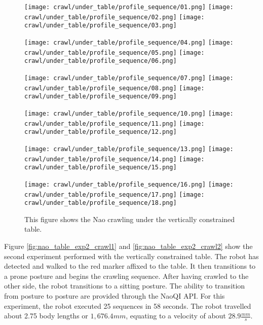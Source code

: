 \begin{figure}
  \centerline{
    \texttt{[image: crawl/under\_table/profile\_sequence/01.png]}
    \texttt{[image: crawl/under\_table/profile\_sequence/02.png]}
    \texttt{[image: crawl/under\_table/profile\_sequence/03.png]}
  }
  \vspace*{0.05in}
  \centerline{
    \texttt{[image: crawl/under\_table/profile\_sequence/04.png]}
    \texttt{[image: crawl/under\_table/profile\_sequence/05.png]}
    \texttt{[image: crawl/under\_table/profile\_sequence/06.png]}
  }
    \vspace*{0.05in}
  \centerline{
    \texttt{[image: crawl/under\_table/profile\_sequence/07.png]}
    \texttt{[image: crawl/under\_table/profile\_sequence/08.png]}
    \texttt{[image: crawl/under\_table/profile\_sequence/09.png]}
  }
    \vspace*{0.05in}
  \centerline{
    \texttt{[image: crawl/under\_table/profile\_sequence/10.png]}
    \texttt{[image: crawl/under\_table/profile\_sequence/11.png]}
    \texttt{[image: crawl/under\_table/profile\_sequence/12.png]}
  }
    \vspace*{0.05in}
  \centerline{
    \texttt{[image: crawl/under\_table/profile\_sequence/13.png]}
    \texttt{[image: crawl/under\_table/profile\_sequence/14.png]}
    \texttt{[image: crawl/under\_table/profile\_sequence/15.png]}
  }
    \vspace*{0.05in}
  \centerline{
    \texttt{[image: crawl/under\_table/profile\_sequence/16.png]}
    \texttt{[image: crawl/under\_table/profile\_sequence/17.png]}
    \texttt{[image: crawl/under\_table/profile\_sequence/18.png]}
  }
  \caption{This figure shows the Nao crawling under the vertically constrained table.}
  \label{fig:nao_table_exp1_crawl1}
\end{figure}

Figure \ref{fig:nao_table_exp2_crawl1} and \ref{fig:nao_table_exp2_crawl2} show the second
experiment performed with the vertically constrained table. The robot has detected and walked to
the red marker affixed to the table. It then transitions to a prone posture and begins the crawling
sequence. After having crawled to the other side, the robot transitions to a sitting posture.
The ability to transition from posture to posture are provided through the NaoQI API.
For this experiment, the robot executed 25 sequences in 58 seconds. The robot travelled
about 2.75 body lengths or $1,676.4 mm$, equating to a velocity of about $28.9 \frac{mm}{s}$.

